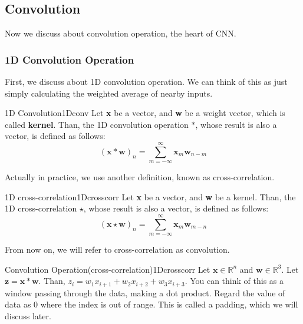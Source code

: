 \documentclass{article}
\begin{document}
    \subsection{Convolution}
        Now we discuss about convolution operation, the heart of CNN.
        \subsubsection{1D Convolution Operation}
            First, we discuss about 1D convolution operation.
            We can think of this as just simply calculating the weighted average of nearby inputs.
            \begin{defn}{1D Convolution}{1Dconv}
                Let \textbf{x} be a vector, and \textbf{w} be a weight vector, which is called \textbf{kernel}.
                Than, the 1D convolution operation $\ast$, whose result is also a vector, is defined as follows:
                \[
                (\textbf{x} \ast \textbf{w})_n = \sum_{m=-\infty}^{\infty}\textbf{x}_m\textbf{w}_{n-m}
                \]
            \end{defn}
            Actually in practice, we use another definition, known as cross-correlation.
            \begin{defn}{1D cross-correlation}{1Dcrosscorr}
                Let \textbf{x} be a vector, and \textbf{w} be a kernel.
                Than, the 1D cross-correlation $\star$, whose result is also a vector, is defined as follows:
                \[
                (\textbf{x} \star \textbf{w})_n = \sum_{m=-\infty}^{\infty}\textbf{x}_m\textbf{w}_{m-n}
                \]
            \end{defn}
            From now on, we will refer to cross-correlation as convolution.
            \begin{exm}{Convolution Operation(cross-correlation)}{1Dcrosscorr}
                Let $\textbf{x}\in\mathbb{R}^n$ and $\textbf{w}\in\mathbb{R}^3$. Let $\textbf{z}=\textbf{x}\ast\textbf{w}$.
                Than, $z_i=w_1x_{i+1}+w_2x_{i+2}+w_3x_{i+3}$. You can think of this as a window passing through the data, making a dot product.
                Regard the value of data as 0 where the index is out of range. This is called a padding, which we will discuss later.
            \end{exm}
\end{document}

